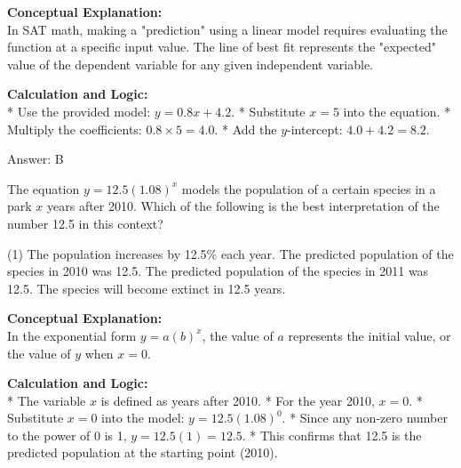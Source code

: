 \documentclass[11pt,paper=a4,answers]{exam}
\begin{document}
\begin{questions}
\begin{solution}
\textbf{Conceptual Explanation:} \\
In SAT math, making a "prediction" using a linear model requires evaluating the function at a specific input value. The line of best fit represents the "expected" value of the dependent variable for any given independent variable.

\vspace{30pt}

\textbf{Calculation and Logic:} \\
* Use the provided model: $y = 0.8x + 4.2$.
* Substitute $x = 5$ into the equation.
* Multiply the coefficients: $0.8 \times 5 = 4.0$.
* Add the $y$-intercept: $4.0 + 4.2 = 8.2$.

\vspace{30pt}

Answer: \colorbox{yellow!100}{B}
\end{solution}

\vspace{60pt}

\question
The equation $y = 12.5(1.08)^x$ models the population of a certain species in a park $x$ years after 2010. Which of the following is the best interpretation of the number 12.5 in this context?
\begin{tasks}(1)
    \task The population increases by 12.5\% each year.
    \task The predicted population of the species in 2010 was 12.5.
    \task The predicted population of the species in 2011 was 12.5.
    \task The species will become extinct in 12.5 years.
\end{tasks}

\begin{solution}
\textbf{Conceptual Explanation:} \\
In the exponential form $y = a(b)^x$, the value of $a$ represents the initial value, or the value of $y$ when $x = 0$.

\vspace{30pt}

\textbf{Calculation and Logic:} \\
* The variable $x$ is defined as years after 2010.
* For the year 2010, $x = 0$.
* Substitute $x = 0$ into the model: $y = 12.5(1.08)^0$.
* Since any non-zero number to the power of 0 is 1, $y = 12.5(1) = 12.5$.
* This confirms that 12.5 is the predicted population at the starting point (2010).

\vspace{30pt}


\end{solution}
\end{questions}
\end{document}
